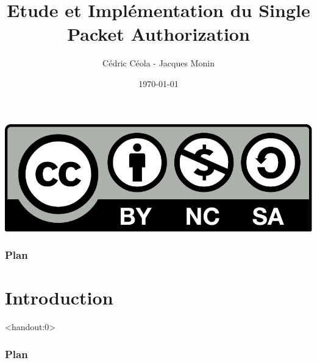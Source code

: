 %
%

\usepackage[french]{babel}

\newcommand{\highlight}[1]{\textcolor{structure.fg}{\bfseries #1}}

\title{Etude et Implémentation du Single Packet Authorization}

\author[CJ]{Cédric Céola - Jacques Monin\\[-.25em]
}




\date{\today}



\begin{frame}
  \vspace{3.5em}
  \titlepage

  \begin{center}
    \includegraphics[scale=.2]{cc-by-nc-sa.pdf}
  \end{center}
\end{frame}

\begin{frame}
  \frametitle{Plan}
  \tableofcontents[subsectionstyle=hide]
\end{frame}

\section{Introduction}

\begin{frame}<handout:0>
  \frametitle{Plan}
  \tableofcontents[currentsection,subsectionstyle=hide]
\end{frame}

